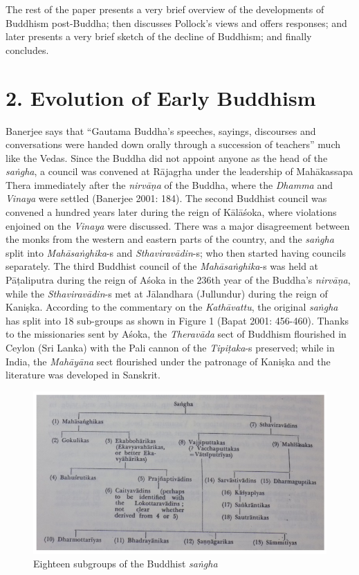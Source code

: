 

The rest of the paper presents a very brief overview of the developments of Buddhism post-Buddha; then discusses Pollock’s views and offers responses; and later presents a very brief sketch of the decline of Buddhism; and finally concludes.


\section*{2. Evolution of Early Buddhism}

Banerjee says that “Gautama Buddha’s speeches, sayings, discourses and conversations were handed down orally through a succession of teachers” much like the Vedas. Since the Buddha did not appoint anyone as the head of the \textit{saṅgha}, a council was convened at Rājagṛha under the leadership of Mahākassapa Thera immediately after the \textit{nirvāṇa} of the Buddha, where the \textit{Dhamma} and \textit{Vinaya} were settled (Banerjee 2001: 184). The second Buddhist council was convened a hundred years later during the reign of Kālāśoka, where violations enjoined on the \textit{Vinaya} were discussed. There was a major disagreement between the monks from the western and eastern parts of the country, and the \textit{saṅgha} split into \textit{Mahāsaṅghika}-s and \textit{Sthaviravādin}-s; who then started having councils separately. The third Buddhist council of the \textit{Mahāsaṅghika}-s was held at Pāṭaliputra during the reign of Aśoka in the 236th year of the Buddha’s \textit{nirvāṇa}, while the \textit{Sthaviravādin}-s met at Jālandhara (Jullundur) during the reign of Kaniṣka. According to the commentary on the \textit{Kathāvattu}, the original \textit{saṅgha} has split into 18 sub-groups as shown in Figure 1 (Bapat 2001: 456-460). Thanks to the missionaries sent by Aśoka, the \textit{Theravāda} sect of Buddhism flourished in Ceylon (Sri Lanka) with the Pali cannon of the \textit{Tipiṭaka}-s preserved; while in India, the \textit{Mahāyāna} sect flourished under the patronage of Kaniṣka and the literature was developed in Sanskrit.

\begin{figure}[!h]
\includegraphics[scale=.35]{images/chap5-1.jpg}
\caption{Eighteen subgroups of the Buddhist \textit{saṅgha}}\label{chap5-fig1}
\end{figure}

